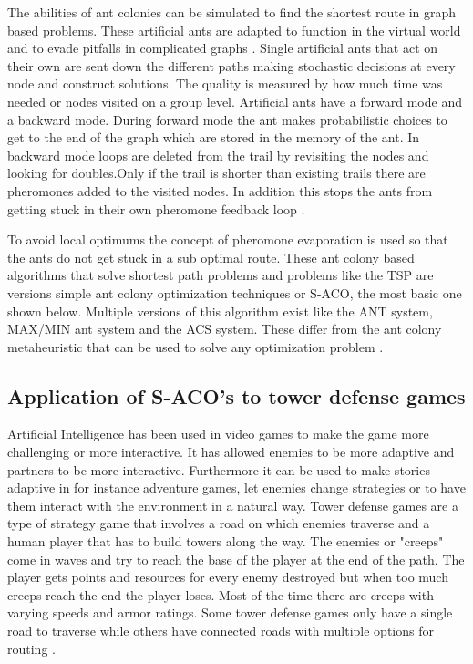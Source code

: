 The abilities of ant colonies can be simulated to find the shortest route in graph based problems. These artificial ants are adapted to function in the virtual world and to evade pitfalls in complicated graphs \cite{gambardella1999macs}.
Single artificial ants that act on their own are sent down the different paths making stochastic decisions at every node and construct solutions. The quality is measured by how much time was needed or nodes visited on a group level.\cite{dorigo2010ant} Artificial ants have a forward mode and a backward mode. During forward mode the ant makes probabilistic choices to get to the end of the graph which are stored in the memory of the ant. In backward mode loops are deleted from the trail by revisiting the nodes and looking for doubles.Only if the trail is shorter than existing trails there are pheromones added to the visited nodes. In addition this stops the ants from getting stuck in their own pheromone feedback loop \cite{dorigo2001experimental}.

To avoid local optimums the concept of pheromone evaporation is used so that the ants do not get stuck in a sub optimal route. \cite{korb2007ant} These ant colony based algorithms that solve shortest path problems and problems like the TSP are versions simple ant colony optimization techniques or S-ACO, the most basic one shown below\cite{dorigo1997ant}.  Multiple versions of this algorithm exist like the ANT system, MAX/MIN ant system and the ACS system. These differ from the ant colony metaheuristic that can be used to solve any optimization problem \cite{stutzle1999max}.

\subsection {Application of S-ACO’s to tower defense games}

Artificial Intelligence has been used in video games to make the game more challenging or more interactive. It has allowed enemies to be more adaptive and partners to be more interactive. Furthermore it can be used to make stories adaptive in for instance adventure games, let enemies change strategies or to have them interact with the environment in a natural way\cite{laird2001human}.  Tower defense games are a type of strategy game that involves a road on which enemies traverse and a human player that has to build towers along the way. The enemies or "creeps" come in waves and try to reach the base of the player at the end of the path. The player gets points and resources for every enemy destroyed but when too much creeps reach the end the player loses. Most of the time there are creeps with varying speeds and armor ratings. Some tower defense games only have a single road to traverse while others have connected roads with multiple options for routing \cite{tan2013automated}.

